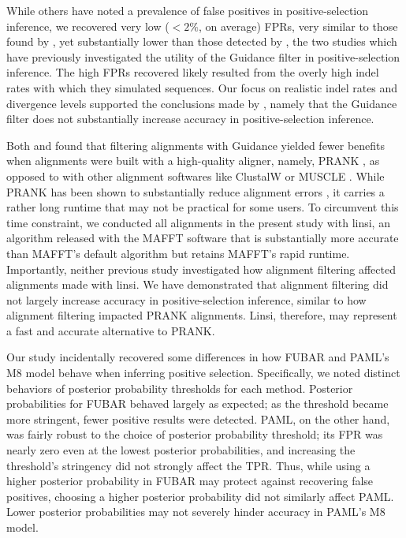 \documentclass[11pt]{article}
\begin{document}
While others \citep{Schneider2009, Fletcher2010, MarkovaRaina2011,Privman2012} have noted a prevalence of false positives in positive-selection inference, we recovered very low ($<2\%$, on average) FPRs, very similar to those found by \citet{Jordan2012}, yet substantially lower than those detected by \citet{Privman2012}, the two studies which have previously investigated the utility of the Guidance filter in positive-selection inference. The high FPRs \citet{Privman2012} recovered likely resulted from the overly high indel rates with which they simulated sequences. Our focus on realistic indel rates and divergence levels supported the conclusions made by \citet{Jordan2012}, namely that the Guidance filter does not substantially increase accuracy in positive-selection inference.

Both \citet{Privman2012} and \citet{Jordan2012} found that filtering alignments with Guidance yielded fewer benefits when alignments were built with a high-quality aligner, namely, PRANK \citep{Loytynoja2008}, as opposed to with other alignment softwares like ClustalW \citep{Thompson1994} or MUSCLE \citep{Edgar2004}. While PRANK has been shown to substantially reduce alignment errors \citep{Loytynoja2008,Privman2012,Jordan2012}, it carries a rather long runtime that may not be practical for some users. To circumvent this time constraint, we conducted all alignments in the present study with linsi, an algorithm released with the MAFFT software that is substantially more accurate than MAFFT's default algorithm \citep{Katoh2005, Nuin2006, Thompson2011} but retains MAFFT's rapid runtime. Importantly, neither previous study investigated how alignment filtering affected alignments made with linsi. We have demonstrated that alignment filtering did not largely increase accuracy in positive-selection inference, similar to how alignment filtering impacted PRANK alignments. Linsi, therefore, may represent a fast and accurate alternative to PRANK.

Our study incidentally recovered some differences in how FUBAR and PAML's M8 model behave when inferring positive selection. Specifically, we noted distinct behaviors of posterior probability thresholds for each method. Posterior probabilities for FUBAR behaved largely as expected; as the threshold became more stringent, fewer positive results were detected. PAML, on the other hand, was fairly robust to the choice of posterior probability threshold; its FPR was nearly zero even at the lowest posterior probabilities, and increasing the threshold's stringency did not strongly affect the TPR. Thus, while using a higher posterior probability in FUBAR may protect against recovering false positives, choosing a higher posterior probability did not similarly affect PAML. Lower posterior probabilities may not severely hinder accuracy in PAML's M8 model.
\end{document}
